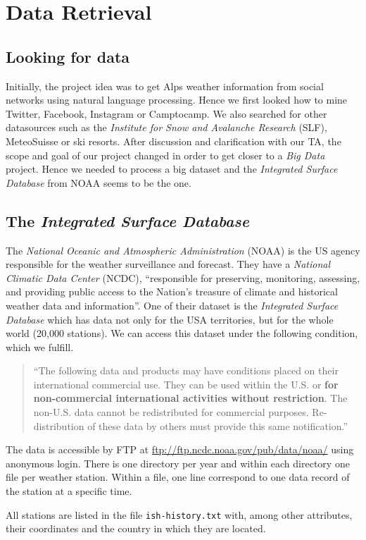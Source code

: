 \section{Data Retrieval}
\subsection{Looking for data}
Initially, the project idea was to get Alps weather information from social networks using natural language processing. Hence we first looked how to mine Twitter, Facebook, Instagram or Camptocamp. We also searched for other datasources such as the \emph{Institute for Snow and Avalanche Research} (SLF), MeteoSuisse or ski resorts. After discussion and clarification with our TA, the scope and goal of our project changed in order to get closer to a \emph{Big Data} project. Hence we needed to process a big dataset and the \emph{Integrated Surface Database} from NOAA seems to be the one.

\subsection{The \emph{Integrated Surface Database}}
The \emph{National Oceanic and Atmospheric Administration} (NOAA) is the US agency responsible for the weather surveillance and forecast. They have a \emph{National Climatic Data Center} (NCDC), “responsible for preserving, monitoring, assessing, and providing public access to the Nation's treasure of climate and historical weather data and information”. One of their dataset is the \emph{Integrated Surface Database} which has data not only for the USA territories, but for the whole world (20,000 stations). We can access this dataset under the following condition, which we fulfill.
\begin{quote}
“The following data and products may have conditions placed on their international commercial use. They can be used within the U.S. or \textbf{for non-commercial international activities without restriction}. The non-U.S. data cannot be redistributed for commercial purposes. Re-distribution of these data by others must provide this same notification.”
\end{quote}
The data is accessible by FTP at \url{ftp://ftp.ncdc.noaa.gov/pub/data/noaa/} using anonymous login. There is one directory per year and within each directory one file per weather station. Within a file, one line correspond to one data record of the station at a specific time.

All stations are listed in the file \texttt{ish-history.txt} with, among other attributes, their coordinates and the country in which they are located.


